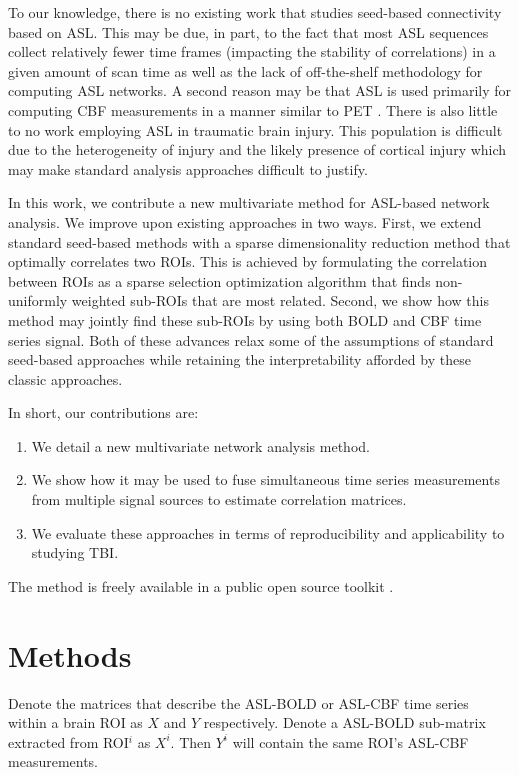 \documentclass{llncs}
\begin{document}
To our knowledge, there is no existing work that studies seed-based connectivity based on ASL.  This may be due, in part, to the fact that most ASL sequences collect relatively fewer time frames (impacting the stability of correlations) in a given amount of scan time as well as the lack of off-the-shelf methodology for computing ASL networks.  A second reason may be that ASL is used primarily for computing CBF measurements in a manner similar to PET \cite{}.  There is also little to no work employing ASL in traumatic brain injury.   This population is difficult due to the heterogeneity of injury and the likely presence of cortical injury which may make standard analysis approaches difficult to justify. 

In this work, we contribute a new multivariate method for ASL-based network analysis.  We improve upon existing approaches in two ways.  First, we extend standard seed-based methods with a sparse dimensionality reduction method that optimally correlates two ROIs.  This is achieved by formulating the correlation between ROIs as a sparse selection optimization algorithm that finds non-uniformly weighted sub-ROIs that are most related.  Second, we show how this method may jointly find these sub-ROIs by using both BOLD and CBF time series signal.  Both of these advances relax some of the assumptions of standard seed-based approaches while retaining the interpretability afforded by these classic approaches.  

In short, our contributions are: 
\begin{enumerate}
\item We detail a new multivariate network analysis method.
\item We show how it may be used to fuse simultaneous time series measurements from multiple signal sources to estimate correlation matrices.
\item We evaluate these approaches in terms of reproducibility and applicability to studying TBI. 
\end{enumerate}
The method is freely available in a public open source toolkit \cite{}.


\section*{Methods}
Denote the matrices that describe the ASL-BOLD or ASL-CBF time series within a brain ROI as $X$ and $Y$ respectively.  Denote a ASL-BOLD sub-matrix extracted from ROI$^i$ as $X^i$.  Then $Y^i$ will contain the same ROI's ASL-CBF measurements.
\end{document}
